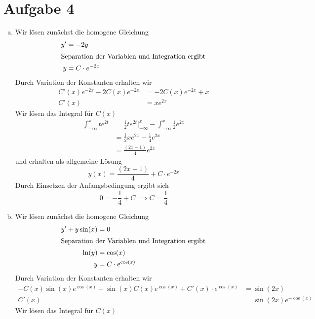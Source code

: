 \documentclass{article}
\begin{document}
    \section*{Aufgabe 4}
    \begin{enumerate}[(a)]
        \item Wir lösen zunächst die homogene Gleichung
        \begin{align*}
            y' &= - 2y\\
            \intertext{Separation der Variablen und Integration ergibt}
            y  &= C \cdot e^{-2x}
        \end{align*}
        Durch Variation der Konstanten erhalten wir
        \begin{align*}
            C'(x) e^{-2x} -2 C(x) e^{-2x} &= -2C(x) e^{-2x} + x\\
            C'(x) &= xe^{2x}
        \end{align*}
        Wir lösen das Integral für $C(x)$
        \begin{align*}
            \int_{-\infty}^x te^{2t} &= \frac{1}{2}te^{2t}\big|_{-\infty}^x - \int_{-\infty}^x \frac{1}{2} e^{2x}\\
            &= \frac{1}{2}xe^{2x} - \frac{1}{4}e^{2x}\\
            &= \frac{(2x - 1)}{4}e^{2x}
        \end{align*}
        und erhalten als allgemeine Lösung
        \[
            y(x) = \frac{(2x - 1)}{4} + C \cdot e^{-2x}
        \]
        Durch Einsetzen der Anfangsbedingung ergibt sich
        \[
            0 = -\frac{1}{4} + C \implies C = \frac{1}{4}
        \]
        \item Wir lösen zunächst die homogene Gleichung
        \begin{align*}
            y' + y\sin(x) &= 0\\
            \intertext{Separation der Variablen und Integration ergibt}
            \ln(y) &= \cos(x)\\
            y &= C \cdot e^{\cos(x)}
        \end{align*}
        Durch Variation der Konstanten erhalten wir
        \begin{align*}
            -C(x) \sin(x) e^{\cos(x)} + \sin(x) C(x) e^{\cos(x)} + C'(x) \cdot e^{\cos(x)} &= \sin(2x)\\
            C'(x) &= \sin(2x)e^{-\cos(x)}
        \end{align*}
        Wir lösen das Integral für $C(x)$
        \begin{align*}

\end{align*}
\end{enumerate}
\end{document}
